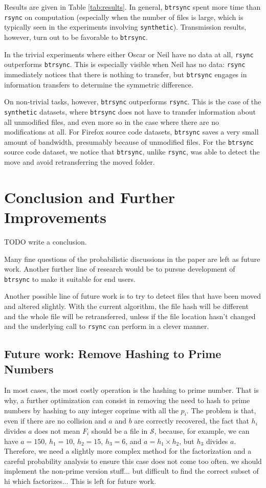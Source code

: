 \documentclass[11pt]{llncs}
\newcommand{\btrsync}{\texttt{btrsync}\xspace}
\newcommand{\rsync}{\texttt{rsync}\xspace}
\newcommand{\comm}[1]{\marginpar{%
\vskip-\baselineskip %
\raggedright\footnotesize
\itshape\hrule\smallskip#1\par\smallskip\hrule}}
\begin{document}
Results are given in Table \ref{tab:results}. In general, \btrsync spent more time than \rsync on computation (especially when the number of files is large, which is typically seen in the experiments involving {\tt synthetic}). Transmission results, however, turn out to be favorable to \btrsync.

In the trivial experiments where either Oscar or Neil have no data at all, \rsync outperforms \btrsync. This is especially visible when Neil has no data: \rsync immediately notices that there is nothing to transfer, but \btrsync engages in information transfers to determine the symmetric
difference.

On non-trivial tasks, however, \btrsync outperforms \rsync. This is the case of the {\tt synthetic} datasets, where \btrsync does not have to transfer
information about all unmodified files, and even more so in the case where there are no modifications at all. For Firefox source code datasets, \btrsync saves a very small amount of bandwidth, presumably because of unmodified files. For the \btrsync source code dataset, we notice that \btrsync, unlike \rsync, was able to detect the move and avoid retransferring the moved folder.

\section{Conclusion and Further Improvements}

TODO write a conclusion.

Many fine questions of the probabilistic discussions in the paper are left as future work.\comm{Be more specific!} Another further line of research would be to pursue development of \btrsync to make it suitable for end users.

Another possible line of future work is to try to detect files that have been
moved and altered slightly. With the current algorithm, the file hash will be
different and the whole file will be retransferred, unless if the file location
hasn't changed and the underlying call to \rsync can perform in a clever manner.

\subsection{Future work: Remove Hashing to Prime Numbers}

In most cases, the most costly operation is the hashing to prime number.
That is why, a further optimization can consist in removing the need to hash to prime numbers by hashing to any integer coprime with all the $p_i$.
The problem is that, even if there are no collision and $a$ and $b$ are correctly recovered, the fact that $h_i$ divides $a$ does not mean $F_i$ should be a file in $\mathcal{S}$, because, for example, we can have $a = 150$, $h_1 = 10$, $h_2 = 15$, $h_3 = 6$, and $a = h_1 \times h_2$, but $h_3$ divides $a$.
Therefore, we need a slightly more complex method for the factorization and a careful probability analysis to ensure this case does not come too often.
we should implement the non-prime version stuff... but difficult to find the correct subset of hi which factorizes...
This is left for future work.
\end{document}
